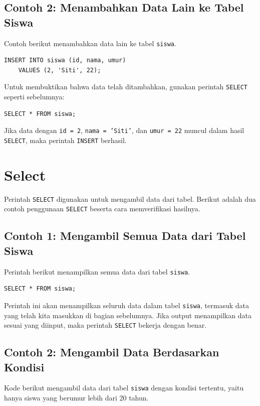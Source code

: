 \subsection*{Contoh 2: Menambahkan Data Lain ke Tabel Siswa}
Contoh berikut menambahkan data lain ke tabel \texttt{siswa}.

\begin{lstlisting}[style=sql]
	INSERT INTO siswa (id, nama, umur)
	VALUES (2, 'Siti', 22);
\end{lstlisting}

Untuk membuktikan bahwa data telah ditambahkan, gunakan perintah \texttt{SELECT} seperti sebelumnya:

\begin{lstlisting}[style=sql]
	SELECT * FROM siswa;
\end{lstlisting}

Jika data dengan \texttt{id = 2}, \texttt{nama = 'Siti'}, dan \texttt{umur = 22} muncul dalam hasil \texttt{SELECT}, maka perintah \texttt{INSERT} berhasil.

\section{Select}

Perintah \texttt{SELECT} digunakan untuk mengambil data dari tabel. Berikut adalah dua contoh penggunaan \texttt{SELECT} beserta cara memverifikasi hasilnya.

\subsection*{Contoh 1: Mengambil Semua Data dari Tabel Siswa}
Perintah berikut menampilkan semua data dari tabel \texttt{siswa}.

\begin{lstlisting}[style=sql]
	SELECT * FROM siswa;
\end{lstlisting}

Perintah ini akan menampilkan seluruh data dalam tabel \texttt{siswa}, termasuk data yang telah kita masukkan di bagian sebelumnya. Jika output menampilkan data sesuai yang diinput, maka perintah \texttt{SELECT} bekerja dengan benar.

\subsection*{Contoh 2: Mengambil Data Berdasarkan Kondisi}
Kode berikut mengambil data dari tabel \texttt{siswa} dengan kondisi tertentu, yaitu hanya siswa yang berumur lebih dari 20 tahun.

